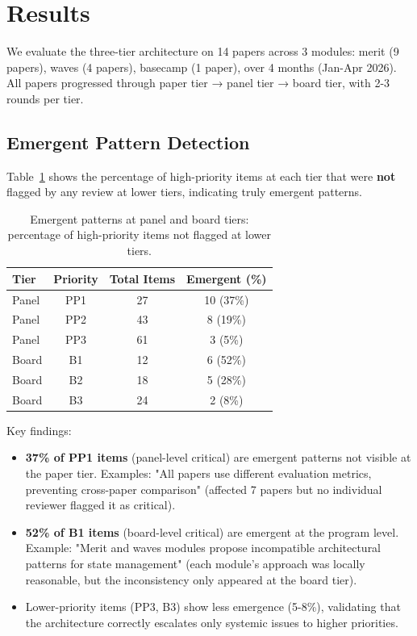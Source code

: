 \section{Results}
\label{sec:results}

We evaluate the three-tier architecture on 14 papers across 3 modules: merit (9 papers), waves (4 papers), basecamp (1 paper), over 4 months (Jan-Apr 2026). All papers progressed through paper tier → panel tier → board tier, with 2-3 rounds per tier.

\subsection{Emergent Pattern Detection}

Table~\ref{tab:emergent} shows the percentage of high-priority items at each tier that were \textbf{not} flagged by any review at lower tiers, indicating truly emergent patterns.

\begin{table}[t]
\centering
\caption{Emergent patterns at panel and board tiers: percentage of high-priority items not flagged at lower tiers.}
\label{tab:emergent}
\begin{tabular}{lccc}
\toprule
Tier & Priority & Total Items & Emergent (\%) \\
\midrule
Panel & PP1 & 27 & 10 (37\%) \\
Panel & PP2 & 43 & 8 (19\%) \\
Panel & PP3 & 61 & 3 (5\%) \\
\midrule
Board & B1 & 12 & 6 (52\%) \\
Board & B2 & 18 & 5 (28\%) \\
Board & B3 & 24 & 2 (8\%) \\
\bottomrule
\end{tabular}
\end{table}

Key findings:
\begin{itemize}
\item \textbf{37\% of PP1 items} (panel-level critical) are emergent patterns not visible at the paper tier. Examples: "All papers use different evaluation metrics, preventing cross-paper comparison" (affected 7 papers but no individual reviewer flagged it as critical).

\item \textbf{52\% of B1 items} (board-level critical) are emergent at the program level. Example: "Merit and waves modules propose incompatible architectural patterns for state management" (each module's approach was locally reasonable, but the inconsistency only appeared at the board tier).

\item Lower-priority items (PP3, B3) show less emergence (5-8\%), validating that the architecture correctly escalates only systemic issues to higher priorities.
\end{itemize}

